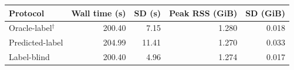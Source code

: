 \begin{tabular}{lrrrr}
\toprule
Protocol & Wall time (s) & SD (s) & Peak RSS (GiB) & SD (GiB) \\
\midrule
Oracle-label$^{\dagger}$ & 200.40 & 7.15 & 1.280 & 0.018 \\
Predicted-label & 204.99 & 11.41 & 1.270 & 0.033 \\
Label-blind & 200.40 & 4.96 & 1.274 & 0.017 \\
\bottomrule
\end{tabular}
